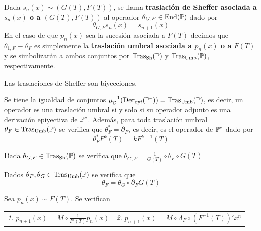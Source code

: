 \begin{definicion}
    Dada $s_n(x) \sim (G(T), F(T))$, se llama \textbf{traslación de Sheffer asociada a $s_n(x)$ o a $(G(T), F(T))$} al operador $\theta_{G,F} \in \operatorname*{End}(\mathbb{P})$ dado por
    \begin{equation*}
        \theta_{G,F} s_n(x) = s_{n+1}(x)
    \end{equation*}
    En el caso de que $p_n(x)$ sea la sucesión asociada a $F(T)$ decimos que $\theta_{1, F} \equiv \theta_{F}$ es simplemente la \textbf{traslación umbral asociada a $p_n(x) $ o a $F(T)$} y se simbolizarán a ambos conjuntos por $\operatorname*{Tras_{Sh}(\mathbb{P})}$ y $\operatorname*{Tras_{Umb}(\mathbb{P})}$, respectivamente.
\end{definicion}

\begin{proposicion}
    Las traslaciones de Sheffer son biyecciones.
\end{proposicion}

\begin{teorema}
    Se tiene la igualdad de conjuntos $\mu_{\mathcal{C}}^{-1}(\operatorname*{Der}_{epi}(\mathbb{P}^*)) = \operatorname*{Tras_{Umb}(\mathbb{P})}$, es decir, un operador es una traslación umbral si y solo si su operador adjunto es una derivación epiyectiva de $\mathbb{P}^*$. Además, para toda traslación umbral $\theta_F \in \operatorname*{Tras_{Umb}(\mathbb{P})}$ se verifica que $\theta_F^* = \partial_F$, es decir, es el operador de $\mathbb{P}^*$ dado por
    \begin{equation*}
        \theta_F^*F^k(T) = kF^{k-1}(T)
    \end{equation*}
\end{teorema}

\begin{proposicion}\label{tras sheffer explicita}
    Dada $\theta_{G,F} \in \operatorname*{Tras_{Sh}(\mathbb{P})}$ se verifica que $\theta_{G,F} = \frac{1}{G(T)}\circ \theta_F \circ G(T)$
\end{proposicion}

\begin{teorema}
    Dados $\theta_F, \theta_G \in \operatorname*{Tras_{Umb}(\mathbb{P})}$ se verifica que
    \begin{equation*}
        \theta_F = \theta_G \circ \partial_F G(T)
    \end{equation*}
\end{teorema}

\begin{teorema}
    Sea $p_n(x) \sim F(T)$. Se verifican
    
    \begin{tabular}{@{}ll@{}}
        \textit{1. } $p_{n+1}(x) = M \circ \frac{1}{F'(T)}p_n(x)$ & 
        \textit{2. } $p_{n+1}(x) = M \circ \Lambda_F \circ (F^{-1}(T))' x^n$
    \end{tabular}
\end{teorema}

